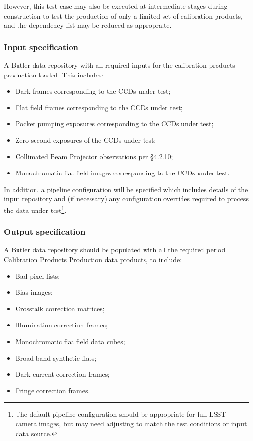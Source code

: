 However, this test case may also be executed at intermediate stages during
construction to test the production of only a limited set of calibration
products, and the dependency list may be reduced as appropraite.

\subsubsection{Input specification}

A Butler data repository with all required inputs for the calibration products
production loaded. This includes:

\begin{itemize}

  \item{Dark frames corresponding to the CCDs under test;}
  \item{Flat field frames corresponding to the CCDs under test;}
  \item{Pocket pumping exposures corresponding to the CCDs under test;}
  \item{Zero-second exposures of the CCDs under test;}
  \item{Collimated Beam Projector observations per  \S4.2.10;}
  \item{Monochromatic flat field images corresponding to the CCDs under test.}

\end{itemize}

In addition, a pipeline configuration will be specified which includes details
of the input repository and (if necessary) any configuration overrides
required to process the data under test\footnote{The default pipeline
configuration should be appropriate for full LSST camera images, but may need
adjusting to match the test conditions or input data source.}.

\subsubsection{Output specification}

A Butler data repository should be populated with all the required period
Calibration Products Production data products, to include:

\begin{itemize}

  \item{Bad pixel lists;}
  \item{Bias images;}
  \item{Crosstalk correction matrices;}
  \item{Illumination correction frames;}
  \item{Monochromatic flat field data cubes;}
  \item{Broad-band synthetic flats;}
  \item{Dark current correction frames;}
  \item{Fringe correction frames.}

\end{itemize}

